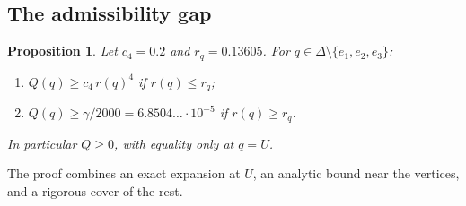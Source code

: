 \documentclass[11pt]{article}
\newtheorem{proposition}[lemma]{Proposition}
\theoremstyle{definition}
\numberwithin{equation}{section}
\newcommand{\Azero}{2000}
\begin{document}
\subsection{The admissibility gap}

\begin{proposition}\label{prop:Q}
Let $c_4=0.2$ and $r_q=0.13605$. For $q\in\Delta\setminus\{e_1,e_2,e_3\}$:
\begin{enumerate}[label=(\roman*)]
\item $Q(q)\ge c_4\,r(q)^4$ if $r(q)\le r_q$;
\item $Q(q)\ge\gamma/\Azero=6.8504\ldots\cdot10^{-5}$ if $r(q)\ge r_q$.
\end{enumerate}
In particular $Q\ge0$, with equality only at $q=U$.
\end{proposition}

The proof combines an exact expansion at $U$, an analytic bound near the vertices, and a rigorous cover of the rest.
\end{document}
